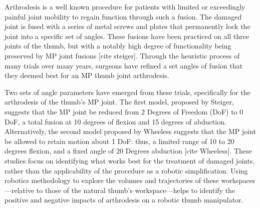 \documentclass[letterpaper, 10 pt, conference]{ieeeconf}  %
\begin{document}
Arthrodesis is a well known procedure for patients with limited or exceedingly painful joint mobility to regain function through such a fusion. The damaged joint is fused with a series of metal screws and plates that permanently lock the joint into a specific set of angles. These fusions have been practiced on all three joints of the thumb, but with a notably high degree of functionality being preserved by MP joint fusions [cite steiger]. Through the heuristic process of many trials over many years, surgeons have refined a set angles of fusion that they deemed best for an MP thumb joint arthrodesis.

Two sets of angle parameters have emerged from these trials, specifically for the arthrodesis of the thumb's MP joint. The first model, proposed by Steiger, suggests that the MP joint be reduced from 2 Degrees of Freedom (DoF) to 0 DoF, a total fusion at 10 degrees of flexion and 15 degrees of abduction. Alternatively, the second model proposed by Wheeless suggests that the MP joint be allowed to retain motion about 1 DoF: thus, a limited range of 10 to 20 degrees flexion, and a fixed angle of 20 Degrees abduction [cite Wheeless]. These studies focus on identifying what works best for the treatment of damaged joints, rather than the applicability of the procedure as a robotic simplification. Using robotics methodology to explore the volumes and trajectories of these workspaces---relative to those of the natural thumb's workspace---helps to identify the positive and negative impacts of arthrodesis on a robotic thumb manipulator.
\end{document}
